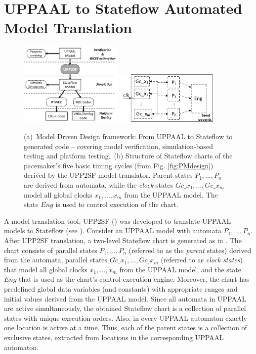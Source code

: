 \section{UPPAAL to Stateflow Automated Model Translation}
\begin{figure}[!b]
\centering
		\subfigure 
		{			
		\includegraphics[width=0.45\textwidth]{figs/method_new1.png}		
		\label{fig:method}
		}
		\hspace{.2in} 
		\subfigure 
		{	
			\includegraphics[width=0.45\textwidth]{figs/chart_GlobalClocks_rev1.png}
			\label{fig:chart}
		}
\caption{(a)~Model Driven Design framework: From UPPAAL to Stateflow to generated code -- covering model verification, simulation-based testing and platform testing.~(b) Structure of Stateflow charts of the pacemaker's five basic timing cycles (from Fig. \ref{fig:PMdesign}) derived by the UPP2SF model translator. Parent states $P_1,...,P_n$ are derived from automata, while the \textit{clock} states $Gc\_{x_1},..., Gc\_{x_m}$ model all global clocks $x_1,...,x_m$ from the UPPAAL model. The state $Eng$ is used to control execution of the chart.}
\label{fig:upp2sftool}
\end{figure} 

A model translation tool, UPP2SF (\cite{TECS}) was developed to translate UPPAAL models to Stateflow (see ). Consider an UPPAAL model with automata $P_1,...,P_n$.  After UPP2SF translation, a two-level Stateflow chart is generated as in . The chart consists of parallel states $P_1,...,P_n$ (referred to as the \textit{parent} states) derived from the automata, parallel states $Gc\_{x_1},..., Gc\_{x_m}$ (referred to as \textit{clock states}) that model all global clocks $x_1,...,x_m$ from the UPPAAL model, and the state $Eng$ that is used as the chart's control execution engine.
Moreover, the chart has predefined global data variables (and constants) with appropriate ranges and initial values derived from the UPPAAL model. 
Since all automata in UPPAAL are active simultaneously, the obtained Stateflow chart is a collection of parallel states with unique execution orders. Also, in every UPPAAL automaton exactly one location is active at a time. Thus, each of the parent states is a collection of exclusive states, extracted from locations in the corresponding UPPAAL automaton. 


